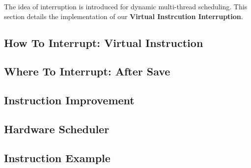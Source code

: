 \label{sec:cnninterrupt}
The idea of interruption is introduced for dynamic multi-thread scheduling. This section details the implementation of our \textbf{Virtual Instrcution Interruption}.

\subsection{How To Interrupt: Virtual Instruction}
\label{sec:howinter}


\subsection{ Where To Interrupt: After Save }
\label{sec:whereinter}


\subsection{ Instruction Improvement }
\label{sec:virtualinstr}


\subsection{ Hardware Scheduler }


\subsection{ Instruction Example }

